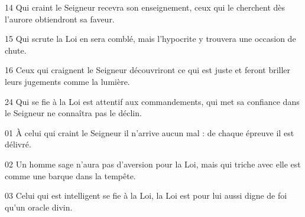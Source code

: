 14 Qui craint le Seigneur recevra son enseignement, ceux qui le cherchent dès l’aurore obtiendront sa faveur.

15 Qui scrute la Loi en sera comblé, mais l’hypocrite y trouvera une occasion de chute.

16 Ceux qui craignent le Seigneur découvriront ce qui est juste et feront briller leurs jugements comme la lumière.

24 Qui se fie à la Loi est attentif aux commandements, qui met sa confiance dans le Seigneur ne connaîtra pas le déclin.

01 À celui qui craint le Seigneur il n’arrive aucun mal : de chaque épreuve il est délivré.

02 Un homme sage n’aura pas d’aversion pour la Loi, mais qui triche avec elle est comme une barque dans la tempête.

03 Celui qui est intelligent se fie à la Loi, la Loi est pour lui aussi digne de foi qu’un oracle divin.


